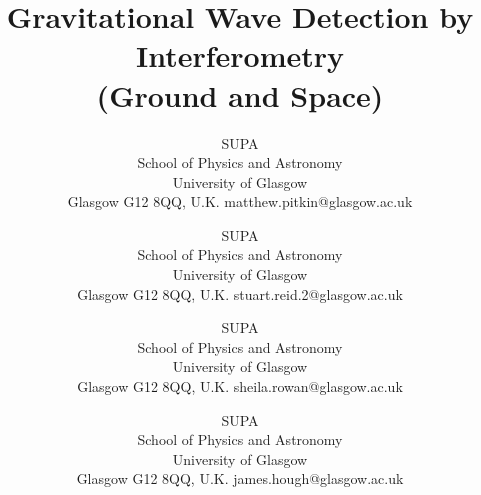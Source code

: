 \documentclass{article}
\begin{document}
\title{Gravitational Wave Detection by Interferometry \\(Ground and Space)}

\author{%
        {SUPA \\
        School of Physics and Astronomy \\
        University of Glasgow \\
        Glasgow G12 8QQ, U.K.}
        {matthew.pitkin@glasgow.ac.uk}
        {}
\and
{}
        {SUPA \\
        School of Physics and Astronomy \\
        University of Glasgow \\
        Glasgow G12 8QQ, U.K.}
        {stuart.reid.2@glasgow.ac.uk}
    {}
\and
{}
        {SUPA \\
        School of Physics and Astronomy \\
        University of Glasgow \\
        Glasgow G12 8QQ, U.K.}
        {sheila.rowan@glasgow.ac.uk}
        {}
\and
{}
        {SUPA \\
        School of Physics and Astronomy \\
        University of Glasgow \\
        Glasgow G12 8QQ, U.K.}
        {james.hough@glasgow.ac.uk}
        {}
}

\date{}
\maketitle




\end{document}
